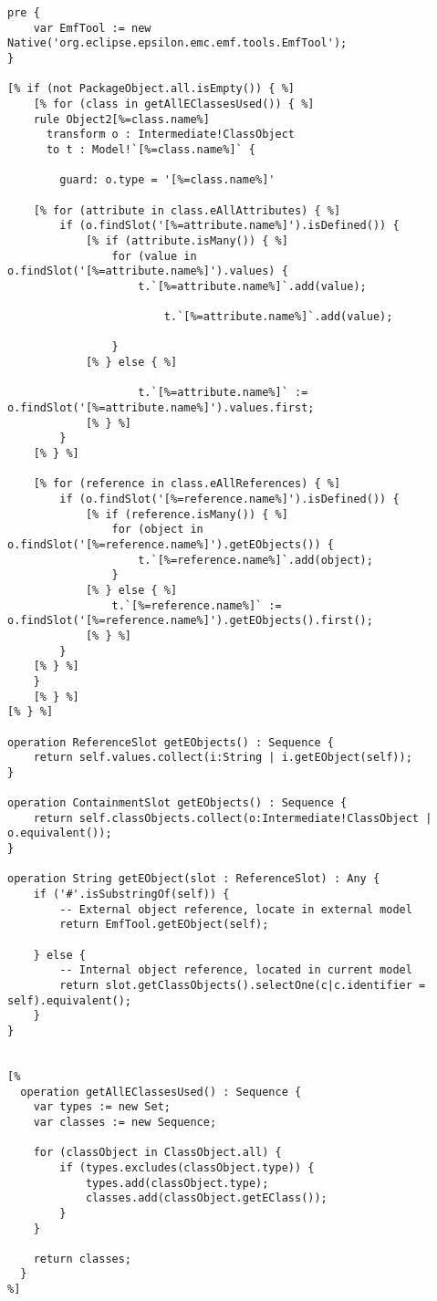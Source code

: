\begin{lstlisting}[caption={[Generating the intermediate to target model transformation]EGL template that generates an intermediate model to target model transformation (in ETL)}, label=lst:generate_full, language=EGL]
pre {
	var EmfTool := new Native('org.eclipse.epsilon.emc.emf.tools.EmfTool');
}

[% if (not PackageObject.all.isEmpty()) { %]
	[% for (class in getAllEClassesUsed()) { %]
	rule Object2[%=class.name%]
	  transform o : Intermediate!ClassObject
	  to t : Model!`[%=class.name%]` {
		
		guard: o.type = '[%=class.name%]'
		
	[% for (attribute in class.eAllAttributes) { %]
		if (o.findSlot('[%=attribute.name%]').isDefined()) {
			[% if (attribute.isMany()) { %]
				for (value in o.findSlot('[%=attribute.name%]').values) {
					t.`[%=attribute.name%]`.add(value);

						t.`[%=attribute.name%]`.add(value);

				}
			[% } else { %]

					t.`[%=attribute.name%]` := o.findSlot('[%=attribute.name%]').values.first;
			[% } %]
		}
	[% } %]
	
	[% for (reference in class.eAllReferences) { %]
		if (o.findSlot('[%=reference.name%]').isDefined()) {
			[% if (reference.isMany()) { %]
				for (object in o.findSlot('[%=reference.name%]').getEObjects()) {
					t.`[%=reference.name%]`.add(object);
				}
			[% } else { %]
				t.`[%=reference.name%]` := o.findSlot('[%=reference.name%]').getEObjects().first();
			[% } %]
		}
	[% } %]
	}
	[% } %]
[% } %]

operation ReferenceSlot getEObjects() : Sequence {
	return self.values.collect(i:String | i.getEObject(self));
}

operation ContainmentSlot getEObjects() : Sequence {
	return self.classObjects.collect(o:Intermediate!ClassObject | o.equivalent());
}

operation String getEObject(slot : ReferenceSlot) : Any {
	if ('#'.isSubstringOf(self)) {
		-- External object reference, locate in external model
		return EmfTool.getEObject(self);
	
	} else {
		-- Internal object reference, located in current model
		return slot.getClassObjects().selectOne(c|c.identifier = self).equivalent();
	}
}


[%
  operation getAllEClassesUsed() : Sequence {
	var types := new Set;
	var classes := new Sequence;

	for (classObject in ClassObject.all) {
		if (types.excludes(classObject.type)) {
			types.add(classObject.type);
			classes.add(classObject.getEClass());
		}
	}
	
	return classes;
  }
%]
\end{lstlisting}
